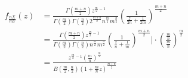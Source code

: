 \documentclass[12pt]{article}
\begin{document}
\begin{align*}
	f_{ \frac{nX}{mY} }(z) &= \frac{
		\Gamma \left( 
	\frac{ m+n }{ 2 }
\right) z ^{\frac{ m }{ 2 }-1} }{ 
				\Gamma(\frac{ m }{ 2 }) \Gamma(\frac{ n }{ 2 })
						2 ^{\frac{ m+n }{ 2 }} 
								n ^{\frac{ m }{ 2 }} m ^{\frac{ n }{ 2 }}
									}
									\left( 
												\frac{ 1 }{ 
																\frac{ z }{ 2n } + \frac{ 1 }{ 2m }
																		}
																				\right) ^{
																						\frac{ m+n }{2}
																							} \\
	&= \frac{
		\Gamma \left( 
	\frac{ m+n }{ 2 }
\right) z ^{\frac{ m }{ 2 }-1} }{ 
				\Gamma(\frac{ m }{ 2 }) \Gamma(\frac{ n }{ 2 })
								n ^{\frac{ m }{ 2 }} m ^{\frac{ n }{ 2 }}
									}
								\left( 
									\frac{ 1 }{ 
								\frac{ z }{ n } + \frac{ 1 }{ m }
							}
						\right) ^{
					\frac{ m+n }{2}
				} \Bigg \vert \cdot \left( \frac{ \frac{ m }{ n } }{ \frac{ m }{ n } } \right) ^{\frac{ m }{ 2 }}\\
	&= \frac{ z ^{ \frac{ m }{ 2 } -1} \left( 
			\frac{ m }{ n }
			\right) ^{ \frac{ m }{ 2 } }  }{ B \left( 
	\frac{ m }{ 2 }, \frac{ n }{ 2 }\right) \left( 
	1+ \frac{ m }{ n }z
	\right) ^{ \frac{ m+n }{ 2 } } } \\
\end{align*}
\end{document}
